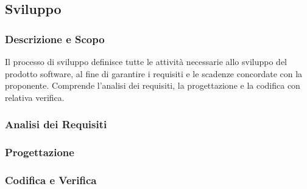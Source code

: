 \subsection{Sviluppo}

\subsubsection{Descrizione e Scopo}
Il processo di sviluppo definisce tutte le attività necessarie allo sviluppo del prodotto software, al fine di garantire i requisiti e le scadenze concordate con la proponente. Comprende l'analisi dei requisiti, la progettazione e la codifica con relativa verifica.\\

\subsubsection{Analisi dei Requisiti}

\subsubsection{Progettazione}

\subsubsection{Codifica e Verifica}
